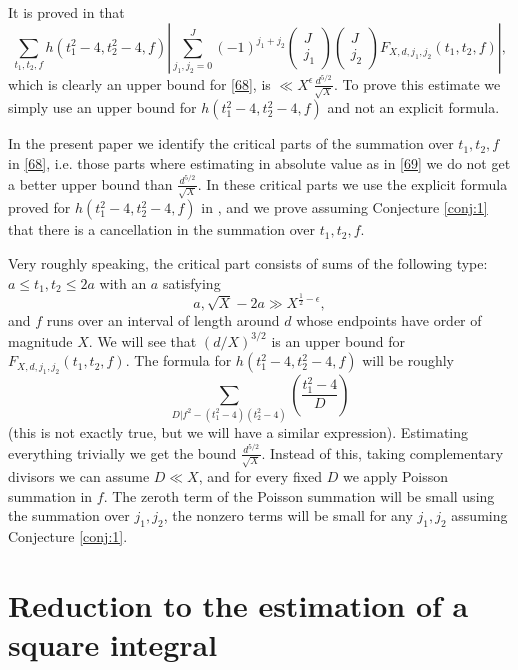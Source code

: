 \documentclass[12pt]{amsart}
\theoremstyle{definition}
\numberwithin{equation}{section}
\begin{document}
It is proved in \cite{Biro} that
\begin{equation}\sum_{t_1,t_2,f}h\left(t_1^2-4,t_2^2-4,f\right)\left
|\sum_{j_1,j_2=0}^J\left(-1\right)^{j_1+j_2}\left(\begin{array}{c}
J\\
j_1\end{array}
\right)\left(\begin{array}{c}
J\\
j_2\end{array}
\right)F_{X,d,j_1,j_2}\left(t_1,t_2,f\right)\right|,\label{69}\end{equation}
which is clearly an upper bound for \eqref{68}, is
$\ll X^{\epsilon}\frac {d^{5/2}}{\sqrt {X}}$. To prove this estimate we simply use an
upper bound for $h\left(t_1^2-4,t_2^2-4,f\right)$ and not an explicit
formula.

In the present paper we identify the critical parts of
the summation over $t_1,t_2,f$ in \eqref{68}, i.e. those parts
where estimating in absolute value as in \eqref{69} we
do not get a better upper bound than $\frac {d^{5/2}}{\sqrt {X}}$. In these
critical parts we use the explicit formula proved for
$h\left(t_1^2-4,t_2^2-4,f\right)$ in \cite{biroClass}, and we prove
assuming Conjecture \ref{conj:1} that there is a cancellation in the summation over $
t_1,t_2,f$.

Very roughly speaking, the critical part consists of
sums of the following type: $a\le t_1,t_2\le 2a$ with an $a$ satisfying
\[a,\sqrt {X}-2a\gg X^{\frac 12-\epsilon},\]
and $f$ runs over an interval of length around $d$ whose
endpoints have order of magnitude $X$. We will see that
$\left(d/X\right)^{3/2}$ is an upper bound for $F_{X,d,j_1,j_2}\left
(t_1,t_2,f\right)$. The formula for $h\left(t_1^2-4,t_2^2-4,f\right
)$ will be roughly
\[\sum_{D|f^2-\left(t_1^2-4\right)\left(t_2^2-4\right)}\left(\frac {
t_1^2-4}D\right)\]
(this is not exactly true, but we will have a similar
expression). Estimating everything trivially we get the bound $\frac {d^{5/2}}{\sqrt {X}}$. Instead of this, taking complementary divisors we can
assume $D\ll X$, and for every fixed $D$ we apply
Poisson summation in $f$. The zeroth term of the Poisson
summation will be small using the summation over $j_1,j_2$,
the nonzero terms will be small for any $j_1,j_2$ assuming
Conjecture \ref{conj:1}.

\section{Reduction to the estimation of a square integral}
\end{document}
